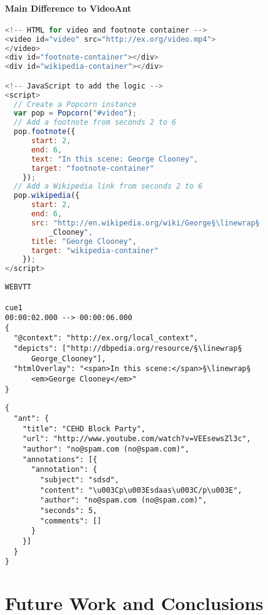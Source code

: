 \documentclass{sig-alternate}
\newcommand{\inlinelistingsize}{\fontsize{8pt}{11pt}}
\let\oldurl\url
\renewcommand{\url}[1]{\inlinelistingsize\oldurl{#1}}
\newcommand{\linewrap}{\raisebox{-.6ex}{\textcolor{grey}{$\hookleftarrow$}}}
\begin{document}
\paragraph{Main Difference to VideoAnt}


\begin{lstlisting}[caption={Popcorn.js example, based on \url{http://jsfiddle.net/rwaldron/xhXE6/} and \url{http://jsfiddle.net/popcornjs/5q7QS/}},
  label=listing:popcorn, float=t!, language=JavaScript]
<!-- HTML for video and footnote container -->
<video id="video" src="http://ex.org/video.mp4">
</video>
<div id="footnote-container"></div>
<div id="wikipedia-container"></div>

<!-- JavaScript to add the logic -->
<script>
  // Create a Popcorn instance
  var pop = Popcorn("#video");
  // Add a footnote from seconds 2 to 6
  pop.footnote({
      start: 2,
      end: 6,
      text: "In this scene: George Clooney",
      target: "footnote-container"
    });
  // Add a Wikipedia link from seconds 2 to 6
  pop.wikipedia({
      start: 2,
      end: 6,
      src: "http://en.wikipedia.org/wiki/George§\linewrap§
          _Clooney",
      title: "George Clooney",
      target: "wikipedia-container"
    });    
</script>
\end{lstlisting}

\begin{lstlisting}[caption={WebVTT annotations analog to \autoref{listing:popcorn}},
  label=listing:webvtt, float=t!]
WEBVTT

cue1
00:00:02.000 --> 00:00:06.000
{
  "@context": "http://ex.org/local_context",
  "depicts": ["http://dbpedia.org/resource/§\linewrap§
      George_Clooney"],
  "htmlOverlay": "<span>In this scene:</span>§\linewrap§
      <em>George Clooney</em>"
}
\end{lstlisting}

\begin{lstlisting}[caption={videoANT annotations analog to \autoref{listing:popcorn}},
  label=listing:videoant, float=t!]
{
  "ant": {
    "title": "CEHD Block Party",
    "url": "http://www.youtube.com/watch?v=VEEsewsZl3c",
    "author": "no@spam.com (no@spam.com)",
    "annotations": [{
      "annotation": {
        "subject": "sdsd",
        "content": "\u003Cp\u003Esdaas\u003C/p\u003E",
        "author": "no@spam.com (no@spam.com)",
        "seconds": 5,
        "comments": []
      }
    }]
  }
}
\end{lstlisting}

\section{Future Work and Conclusions}
\label{sec:future-work-conclusions}
\end{document}
